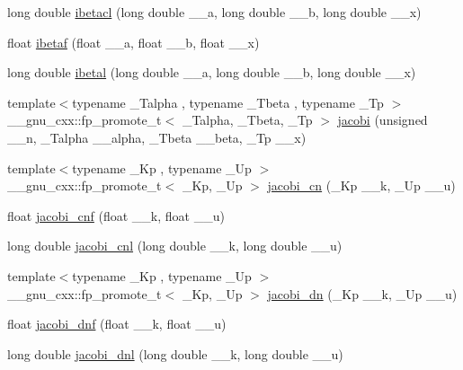 \begin{DoxyCompactItemize}
\item 
long double \hyperlink{group__mathsf__gnu_ga48995d537b82e426362a4831ffa1be39}{ibetacl} (long double \+\_\+\+\_\+a, long double \+\_\+\+\_\+b, long double \+\_\+\+\_\+x)
\item 
float \hyperlink{group__mathsf__gnu_ga97a5e3afdd990a2d3e199df6856bcf9f}{ibetaf} (float \+\_\+\+\_\+a, float \+\_\+\+\_\+b, float \+\_\+\+\_\+x)
\item 
long double \hyperlink{group__mathsf__gnu_ga5c9c5b583e4f1c9785a1c4582551c97f}{ibetal} (long double \+\_\+\+\_\+a, long double \+\_\+\+\_\+b, long double \+\_\+\+\_\+x)
\item 
{\footnotesize template$<$typename \+\_\+\+Talpha , typename \+\_\+\+Tbeta , typename \+\_\+\+Tp $>$ }\\\+\_\+\+\_\+gnu\+\_\+cxx\+::fp\+\_\+promote\+\_\+t$<$ \+\_\+\+Talpha, \+\_\+\+Tbeta, \+\_\+\+Tp $>$ \hyperlink{group__mathsf__gnu_gad54f6601748324d268532138eb38ca33}{jacobi} (unsigned \+\_\+\+\_\+n, \+\_\+\+Talpha \+\_\+\+\_\+alpha, \+\_\+\+Tbeta \+\_\+\+\_\+beta, \+\_\+\+Tp \+\_\+\+\_\+x)
\item 
{\footnotesize template$<$typename \+\_\+\+Kp , typename \+\_\+\+Up $>$ }\\\+\_\+\+\_\+gnu\+\_\+cxx\+::fp\+\_\+promote\+\_\+t$<$ \+\_\+\+Kp, \+\_\+\+Up $>$ \hyperlink{group__mathsf__gnu_ga2e1c43b232d378164bed1433041ca7dc}{jacobi\+\_\+cn} (\+\_\+\+Kp \+\_\+\+\_\+k, \+\_\+\+Up \+\_\+\+\_\+u)
\item 
float \hyperlink{group__mathsf__gnu_gadbd6320123f45ae10d539cf8df0373cd}{jacobi\+\_\+cnf} (float \+\_\+\+\_\+k, float \+\_\+\+\_\+u)
\item 
long double \hyperlink{group__mathsf__gnu_ga08892965ea520116cc53a764513fe685}{jacobi\+\_\+cnl} (long double \+\_\+\+\_\+k, long double \+\_\+\+\_\+u)
\item 
{\footnotesize template$<$typename \+\_\+\+Kp , typename \+\_\+\+Up $>$ }\\\+\_\+\+\_\+gnu\+\_\+cxx\+::fp\+\_\+promote\+\_\+t$<$ \+\_\+\+Kp, \+\_\+\+Up $>$ \hyperlink{group__mathsf__gnu_ga0f8fa8d6a77dbc2089d65f3f16876aa9}{jacobi\+\_\+dn} (\+\_\+\+Kp \+\_\+\+\_\+k, \+\_\+\+Up \+\_\+\+\_\+u)
\item 
float \hyperlink{group__mathsf__gnu_gae96327d678adc6b5c4051f1c3649549a}{jacobi\+\_\+dnf} (float \+\_\+\+\_\+k, float \+\_\+\+\_\+u)
\item 
long double \hyperlink{group__mathsf__gnu_gae59786991abbf8359deef49b6323065a}{jacobi\+\_\+dnl} (long double \+\_\+\+\_\+k, long double \+\_\+\+\_\+u)

\end{DoxyCompactItemize}
